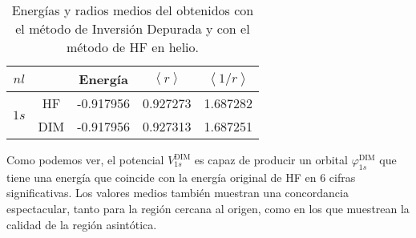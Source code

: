 \begin{table}
\begin{center}
\begin{tabular}{|c|c|c|c|c|}
\hline
$nl$ & & Energía & $\left<r\right>$ & $\left<1/r\right>$ \\
\hline
\hline
\multirow{2}{*}{$1s$} 
     &  HF  & -0.917956 & 0.927273 & 1.687282 \\
     & DIM  & -0.917956 & 0.927313 & 1.687251 \\
\hline
\end{tabular}
\caption[Energías y radios medios obtenidos con DIM y HF para helio.]
{Energías y radios medios del obtenidos con el método de Inversión 
Depurada y con el método de HF en helio.}
\label{tab:resultadosHe}
\end{center}
\end{table}

Como podemos ver, el potencial $V_{1s}^{\mathrm{ DIM}}$ es capaz de 
producir un orbital $\varphi_{1s}^{\mathrm{ DIM}}$ que tiene una 
energía que coincide con la energía original de HF en 6 cifras 
significativas. 
Los valores medios también muestran una concordancia espectacular, 
tanto para la región cercana al origen, como en los que muestrean 
la calidad de la región asintótica.

\begin{comment}
\begin{table}
\centering
\begin{tabular}{lccccccc}
\hline
\multirow{2}{*}{Método} 
 & \multirow{2}{*}{$nl$}
 & \multirow{2}{*}{$E$} 
 & \multirow{2}{*}{$\langle r\rangle$} 
 & \multirow{2}{*}{$\langle 1/r\rangle$}
 & \multicolumn{2}{c}{Parámetros}  \\
 &  &  & & & $z$ & $\alpha$ \\
\hline
\arrayrulecolor{gray!30!white}
\hline
\multirow{2}{*}{Ajuste manual} 
 & \multirow{2}{*}{$1s$} & \multirow{2}{*}{$-0.91796$} %
                         & \multirow{2}{*}{$0.92731$}  %
                         & \multirow{2}{*}{$1.68725$}  %
\hline
\multirow{2}{*}{Hartree--Fock} 
 & \multirow{2}{*}{$1s$} & \multirow{2}{*}{$-0.91796$} 
                         & \multirow{2}{*}{$0.92727$}
                         & \multirow{2}{*}{$1.68728$} & & \\
\\
\arrayrulecolor{black}\hline
\end{tabular}
\caption[Comparación de observables según ajuste de la carga efectiva de helio.]
{Comparación de energía y valores medios de la función de onda del 
orbital $1s$ de helio obtenidos mediante la diagonalización de la carga
efectiva $Z_{1s}^{\mathrm{DIM}}$. Los parámetros que definen la carga
se obtienen mediante la optimización manual.}
\label{tab:params-helio}
\end{table}
\end{comment}

